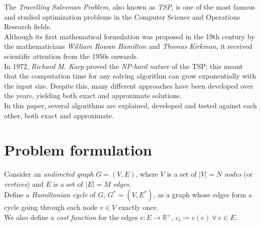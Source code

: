 The \textit{Travelling Salesman Problem}, also known as \textit{TSP}, is one of the most famous and studied optimization problems in the Computer Science and Operations Research fields.\\
Although its first mathematical formulation was proposed in the 19th century by the mathematicians \textit{William Rowan Hamilton} and \textit{Thomas Kirkman}, it received scientific attention from the 1950s onwards.\\
In 1972, \textit{Richard M. Karp} proved the \textit{NP-hard nature} of the TSP; this meant that the computation time for any solving algorithm can grow exponentially with the input size. Despite this, many different approaches have been developed over the years, yielding both exact and approximate solutions.\\

In this paper, several algorithms are explained, developed and tested against each other, both exact and approximate.

\section{Problem formulation}

Consider an \textit{undirected graph} $G=(V, E)$, where $V$ is a set of $|V|=N$ \textit{nodes} (or \textit{vertices}) and $E$ is a set of $|E|=M$ \textit{edges}.\\
Define a \textit{Hamiltonian cycle} of $G$, $G^*=(V, E^*)$, as a graph whose edges form a cycle going through each node $v\in V$ exactly once.\\
We also define a \textit{cost function} for the edges $c : E \rightarrow \mathbb{R}^+$, $c_e\coloneq c(e) \ \forall \ e\in E$.\\

